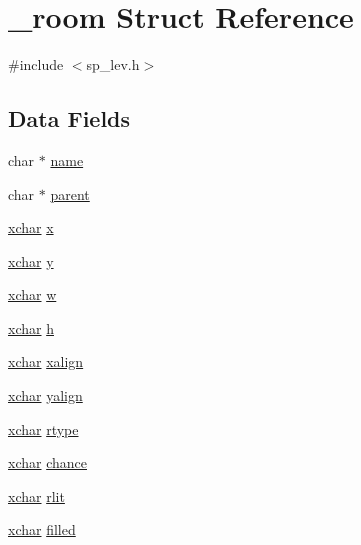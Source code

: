 \hypertarget{struct__room}{\section{\+\_\+room Struct Reference}
\label{struct__room}
}


{\ttfamily \#include $<$sp\+\_\+lev.\+h$>$}

\subsection*{Data Fields}
\begin{DoxyCompactItemize}
\item 
char $\ast$ \hyperlink{struct__room_aca2280b1ca899bab061cca7b062ce195}{name}
\item 
char $\ast$ \hyperlink{struct__room_ad0c17b49155ae5f1517fa3227e0d48e6}{parent}
\item 
\hyperlink{global_8h_a2043b7d01ce89f4ee2fa6c345a752d32}{xchar} \hyperlink{struct__room_a7f3be8a31d75214a0e94c3bfb75d1fda}{x}
\item 
\hyperlink{global_8h_a2043b7d01ce89f4ee2fa6c345a752d32}{xchar} \hyperlink{struct__room_a62bdbccfce4dd3dcd1af7d5bf1d36041}{y}
\item 
\hyperlink{global_8h_a2043b7d01ce89f4ee2fa6c345a752d32}{xchar} \hyperlink{struct__room_a468bcdac94f7322f6ec4a0565e7e51d7}{w}
\item 
\hyperlink{global_8h_a2043b7d01ce89f4ee2fa6c345a752d32}{xchar} \hyperlink{struct__room_a3b5a0d626176f0e352f910f2b341dfa0}{h}
\item 
\hyperlink{global_8h_a2043b7d01ce89f4ee2fa6c345a752d32}{xchar} \hyperlink{struct__room_a18538541f582181a368b543e6d36a4d2}{xalign}
\item 
\hyperlink{global_8h_a2043b7d01ce89f4ee2fa6c345a752d32}{xchar} \hyperlink{struct__room_a521977071dfc4981b7f294dfdf59cf6d}{yalign}
\item 
\hyperlink{global_8h_a2043b7d01ce89f4ee2fa6c345a752d32}{xchar} \hyperlink{struct__room_aead16a1e5cdaa60d26ec4be9240ceb94}{rtype}
\item 
\hyperlink{global_8h_a2043b7d01ce89f4ee2fa6c345a752d32}{xchar} \hyperlink{struct__room_a9c033e9f0b02e503f8c28e52f388f20b}{chance}
\item 
\hyperlink{global_8h_a2043b7d01ce89f4ee2fa6c345a752d32}{xchar} \hyperlink{struct__room_a4456f444341aea7d18c68cc4400becec}{rlit}
\item 
\hyperlink{global_8h_a2043b7d01ce89f4ee2fa6c345a752d32}{xchar} \hyperlink{struct__room_a915f3f466b1a51ba9c70ea4cb669c19f}{filled}

\end{DoxyCompactItemize}
